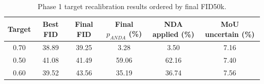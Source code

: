 \begin{table}[t]
\centering
\caption{Phase 1 target recalibration results ordered by final FID50k.}
\label{tab:phase1_inverted_final_fid}
\begin{tabular}{cccccc}
\hline
Target & Best FID & Final FID & Final $p_{ANDA}$ (\%) & NDA applied (\%) & MoU uncertain (\%) \\
\hline
0.70 & 38.89 & 39.25 & 3.28 & 3.50 & 7.16 \\
0.50 & 41.08 & 41.49 & 59.06 & 62.16 & 7.40 \\
0.60 & 39.52 & 43.56 & 35.19 & 36.74 & 7.56 \\
\hline
\end{tabular}
\end{table}

